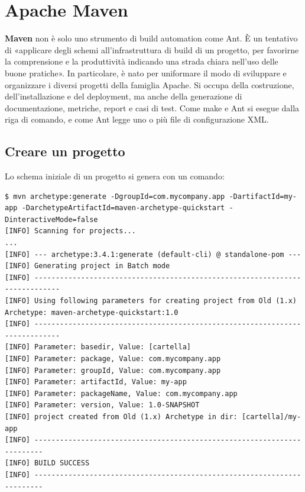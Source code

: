 \section{Apache Maven}

\textbf{Maven} non è solo uno strumento di build automation come Ant. È un tentativo di «applicare degli schemi
all'infrastruttura di build di un progetto, per favorirne la comprensione e la produttività indicando una strada chiara
nell'uso delle buone pratiche». In particolare, è nato per uniformare il modo di sviluppare e organizzare i diversi
progetti della famiglia Apache. Si occupa della costruzione, dell'installazione e del deployment, ma anche della
generazione di documentazione, metriche, report e casi di test. Come make e Ant si esegue dalla riga di comando, e come
Ant legge uno o più file di configurazione XML.

\subsection{Creare un progetto}

Lo schema iniziale di un progetto si genera con un comando:

\begin{lstlisting}[style=shell, name=Terminale]
$ mvn archetype:generate -DgroupId=com.mycompany.app -DartifactId=my-app -DarchetypeArtifactId=maven-archetype-quickstart -DinteractiveMode=false
[INFO] Scanning for projects...
...
[INFO] --- archetype:3.4.1:generate (default-cli) @ standalone-pom ---
[INFO] Generating project in Batch mode
[INFO] ----------------------------------------------------------------------------
[INFO] Using following parameters for creating project from Old (1.x) Archetype: maven-archetype-quickstart:1.0
[INFO] ----------------------------------------------------------------------------
[INFO] Parameter: basedir, Value: [cartella]
[INFO] Parameter: package, Value: com.mycompany.app
[INFO] Parameter: groupId, Value: com.mycompany.app
[INFO] Parameter: artifactId, Value: my-app
[INFO] Parameter: packageName, Value: com.mycompany.app
[INFO] Parameter: version, Value: 1.0-SNAPSHOT
[INFO] project created from Old (1.x) Archetype in dir: [cartella]/my-app
[INFO] ------------------------------------------------------------------------
[INFO] BUILD SUCCESS
[INFO] ------------------------------------------------------------------------
\end{lstlisting}

